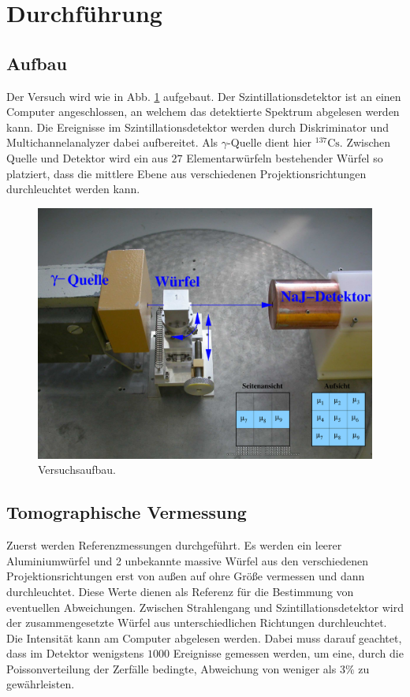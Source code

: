 \section{Durchführung}
\label{sec:Durchführung}
\subsection{Aufbau}
Der Versuch wird wie in Abb. \ref{fig:auf} aufgebaut. Der Szintillationsdetektor ist an einen Computer angeschlossen, an welchem das detektierte Spektrum abgelesen werden kann. Die Ereignisse im Szintillationsdetektor werden durch Diskriminator und Multichannelanalyzer dabei aufbereitet. Als $\gamma$-Quelle dient hier $^{137}\mathup{Cs}$.
Zwischen Quelle und Detektor wird ein aus $27$ Elementarwürfeln bestehender Würfel so platziert, dass die mittlere Ebene aus verschiedenen Projektionsrichtungen durchleuchtet werden kann.
\begin{figure}
	\centering
	\includegraphics[width=\textwidth]{graphics/auf.png}
	\caption{Versuchsaufbau. \cite{Anleitung}}
	\label{fig:auf}	
\end{figure}
\subsection{Tomographische Vermessung}
Zuerst werden Referenzmessungen durchgeführt. Es werden ein leerer Aluminiumwürfel und 2 unbekannte massive Würfel aus den verschiedenen Projektionsrichtungen erst von außen auf ohre Größe vermessen und dann durchleuchtet.
Diese Werte dienen als Referenz für die Bestimmung von eventuellen Abweichungen.
Zwischen Strahlengang und Szintillationsdetektor wird der zusammengesetzte Würfel aus unterschiedlichen Richtungen durchleuchtet.
Die Intensität kann am Computer abgelesen werden. Dabei muss darauf geachtet, dass im Detektor wenigstens $1000$ Ereignisse gemessen werden, um eine, durch die Poissonverteilung der Zerfälle bedingte, Abweichung von weniger als $3\%$ zu gewährleisten.

